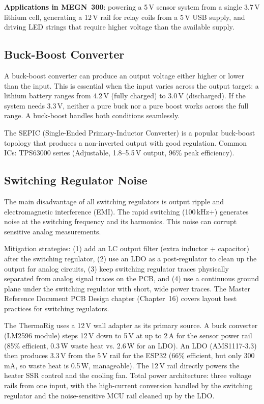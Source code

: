 \documentclass[11pt,letterpaper,twoside,openany]{book}
\begin{document}
\textbf{Applications in MEGN~300}: powering a 5\,V sensor system from a single 3.7\,V lithium cell, generating a 12\,V rail for relay coils from a 5\,V USB supply, and driving LED strings that require higher voltage than the available supply.

\subsection{Buck-Boost Converter}
A buck-boost converter can produce an output voltage either higher or lower than the input. This is essential when the input varies across the output target: a lithium battery ranges from 4.2\,V (fully charged) to 3.0\,V (discharged). If the system needs 3.3\,V, neither a pure buck nor a pure boost works across the full range. A buck-boost handles both conditions seamlessly.

The SEPIC (Single-Ended Primary-Inductor Converter) is a popular buck-boost topology that produces a non-inverted output with good regulation. Common ICs: TPS63000 series (Adjustable, 1.8--5.5\,V output, 96\% peak efficiency).

\subsection{Switching Regulator Noise}
The main disadvantage of all switching regulators is output ripple and electromagnetic interference (EMI). The rapid switching (100\,kHz+) generates noise at the switching frequency and its harmonics. This noise can corrupt sensitive analog measurements.

Mitigation strategies: (1) add an LC output filter (extra inductor + capacitor) after the switching regulator, (2) use an LDO as a post-regulator to clean up the output for analog circuits, (3) keep switching regulator traces physically separated from analog signal traces on the PCB, and (4) use a continuous ground plane under the switching regulator with short, wide power traces. The Master Reference Document PCB Design chapter (Chapter~16) covers layout best practices for switching regulators.

\begin{examplebox}
The ThermoRig uses a 12\,V wall adapter as its primary source. A buck converter (LM2596 module) steps 12\,V down to 5\,V at up to 2\,A for the sensor power rail (85\% efficient, 0.3\,W waste heat vs. 2.6\,W for an LDO). An LDO (AMS1117-3.3) then produces 3.3\,V from the 5\,V rail for the ESP32 (66\% efficient, but only 300\,mA, so waste heat is 0.5\,W, manageable). The 12\,V rail directly powers the heater SSR control and the cooling fan. Total power architecture: three voltage rails from one input, with the high-current conversion handled by the switching regulator and the noise-sensitive MCU rail cleaned up by the LDO.
\end{examplebox}
\end{document}
